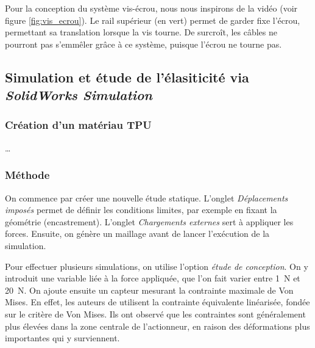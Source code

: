 \documentclass[a4paper, 11pt]{report}
\begin{document}
        Pour la conception du système vis-écrou, nous nous inspirons de la vidéo \cite{w3d_tech_systeme_2023} (voir figure \ref{fig:vis_ecrou}). Le rail supérieur (en vert) permet de garder fixe l'écrou, permettant sa translation lorsque la vis tourne. De surcroît, les câbles ne pourront pas s'emmêler grâce à ce système, puisque l'écrou ne tourne pas.

    \subsection{Simulation et étude de l'élasiticité via \textit{SolidWorks Simulation}}

        \subsubsection{Création d'un matériau TPU}

            \dots

        \subsubsection{Méthode}

            On commence par créer une nouvelle étude statique. L’onglet \textit{Déplacements imposés} permet de définir les conditions limites, par exemple en fixant la géométrie (encastrement). L’onglet \textit{Chargements externes} sert à appliquer les forces. Ensuite, on génère un maillage avant de lancer l’exécution de la simulation.

            Pour effectuer plusieurs simulations, on utilise l’option \textit{étude de conception}. On y introduit une variable liée à la force appliquée, que l’on fait varier entre 1~N et 20~N. On ajoute ensuite un capteur mesurant la contrainte maximale de Von Mises. En effet, les auteurs de \cite{bhat_numerical_2025} utilisent la contrainte équivalente linéarisée, fondée sur le critère de Von Mises. Ils ont observé que les contraintes sont généralement plus élevées dans la zone centrale de l’actionneur, en raison des déformations plus importantes qui y surviennent.

    
    
    
\end{document}
